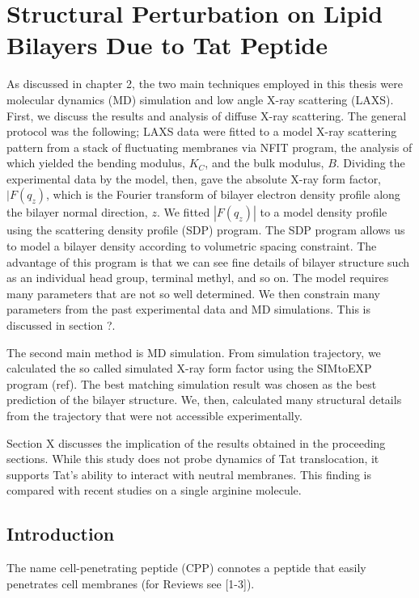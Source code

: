 \chapter{Structural Perturbation on Lipid Bilayers Due to Tat Peptide}
As discussed in chapter 2, the two main techniques employed in this thesis 
were molecular dynamics (MD) simulation and low angle X-ray scattering (LAXS).
First, we discuss the results and analysis of diffuse X-ray scattering. The
general protocol was the following; LAXS data were fitted to a model X-ray
scattering pattern from a stack of fluctuating membranes via NFIT program,
the analysis of which yielded the bending modulus, $K_C$, and the bulk
modulus, $B$. Dividing the experimental data by the model, then, gave the 
absolute X-ray form factor, $|F(q_z)$, which is the Fourier transform
of bilayer electron density profile along the bilayer normal direction, $z$. 
We fitted $|F(q_z)|$ to a model density profile using the scattering density
profile (SDP) program. The SDP program allows us to model a bilayer density
according to volumetric spacing constraint. The advantage of this program is
that we can see fine details of bilayer structure such as an individual
head group, terminal methyl, and so on. The model requires many parameters
that are not so well determined. We then constrain many parameters from
the past experimental data and MD simulations. This is discussed in 
section ?.

The second main method is MD simulation. From simulation trajectory, we 
calculated the so called simulated X-ray form factor using the SIMtoEXP
program (ref). The best matching simulation result was chosen as the best
prediction of the bilayer structure. We, then, calculated many structural
details from the trajectory that were not accessible experimentally.   

Section X discusses the implication of the results obtained in the proceeding 
sections. While this study does not probe dynamics of Tat translocation,
it supports Tat's ability to interact with neutral membranes. This finding
is compared with recent studies on a single arginine molecule.

\section{Introduction}\label{sec:Tat_intro}
The name cell-penetrating peptide (CPP) connotes a peptide that 
easily penetrates cell membranes (for Reviews see [1-3]). 

